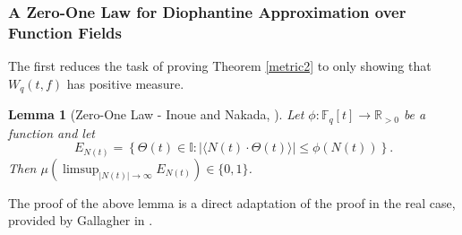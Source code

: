 \documentclass{article}
\newtheorem{lemma}[theorem]{Lemma}
\theoremstyle{definition}
\newcommand{\R}{\mathbb{R}}
\newcommand{\F}{\mathbb{F}}
\numberwithin{equation}{subsection}
\begin{document}
\subsubsection*{A Zero-One Law for Diophantine Approximation over Function Fields}
The first reduces the task of proving Theorem \ref{metric2} to only showing that $W_q(t,f)$ has positive measure.
\begin{lemma}[Zero-One Law - Inoue and Nakada, \cite{DSFF}]\label{fullmeas}
   Let $\phi:\F_q[t]\to\R_{>0}$ be a function and let\[E_{N(t)}=\left\{\Theta(t)\in\mathbb{I}: \left|\langle N(t)\cdot \Theta(t)\rangle\right|\le \phi(N(t))\right\}.\] Then $\mu(\limsup_{|N(t)|\to\infty}E_{N(t)})\in\{0,1\}$.
\end{lemma}

\noindent The proof of the above lemma is a direct adaptation of the proof in the real case, provided by Gallagher in \cite{zeroone}. 
\end{document}
